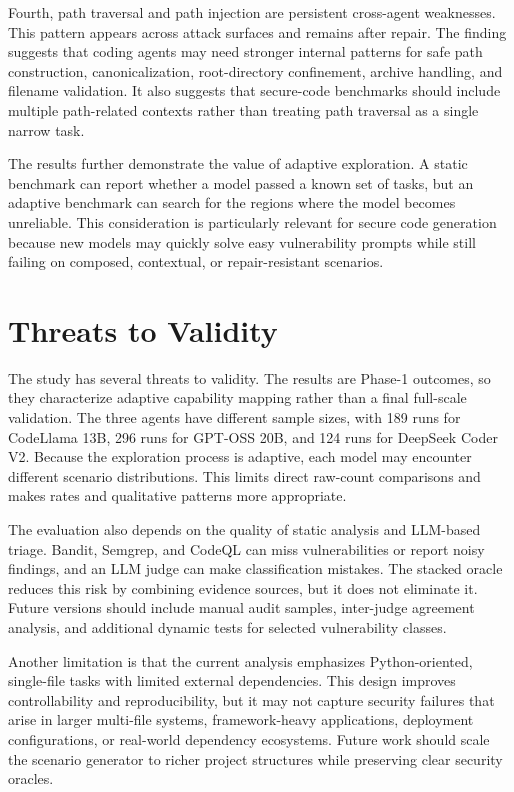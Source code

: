 \documentclass[11pt]{article}
\begin{document}
Fourth, path traversal and path injection are persistent cross-agent weaknesses. This pattern appears across attack surfaces and remains after repair. The finding suggests that coding agents may need stronger internal patterns for safe path construction, canonicalization, root-directory confinement, archive handling, and filename validation. It also suggests that secure-code benchmarks should include multiple path-related contexts rather than treating path traversal as a single narrow task.

The results further demonstrate the value of adaptive exploration. A static benchmark can report whether a model passed a known set of tasks, but an adaptive benchmark can search for the regions where the model becomes unreliable. This consideration is particularly relevant for secure code generation because new models may quickly solve easy vulnerability prompts while still failing on composed, contextual, or repair-resistant scenarios.

\FloatBarrier
\section{Threats to Validity}

The study has several threats to validity. The results are Phase-1 outcomes, so they characterize adaptive capability mapping rather than a final full-scale validation. The three agents have different sample sizes, with 189 runs for CodeLlama 13B, 296 runs for GPT-OSS 20B, and 124 runs for DeepSeek Coder V2. Because the exploration process is adaptive, each model may encounter different scenario distributions. This limits direct raw-count comparisons and makes rates and qualitative patterns more appropriate.

The evaluation also depends on the quality of static analysis and LLM-based triage. Bandit, Semgrep, and CodeQL can miss vulnerabilities or report noisy findings, and an LLM judge can make classification mistakes. The stacked oracle reduces this risk by combining evidence sources, but it does not eliminate it. Future versions should include manual audit samples, inter-judge agreement analysis, and additional dynamic tests for selected vulnerability classes.

Another limitation is that the current analysis emphasizes Python-oriented, single-file tasks with limited external dependencies. This design improves controllability and reproducibility, but it may not capture security failures that arise in larger multi-file systems, framework-heavy applications, deployment configurations, or real-world dependency ecosystems. Future work should scale the scenario generator to richer project structures while preserving clear security oracles.
\end{document}
